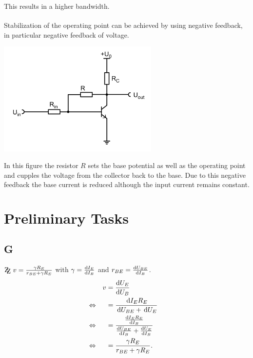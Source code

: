 \documentclass[a4paper,10pt]{article}
\newcommand{\td}{\,\text{d}}
\newcommand{\zz}{\mathrm{Z\kern-.3em\raise-0.5ex\hbox{Z} }}
\newenvironment{Figure}
  {\par\medskip\noindent\minipage{\linewidth}}
  {\endminipage\par\medskip} %
\numberwithin{equation}{section}
\begin{document}
\begin{multicols}{2}
        This results in a higher bandwidth.
        \\\\ Stabilization of the operating point can be achieved by using negative feedback, in particular negative feedback of voltage.
        \begin{Figure}
                \centering
                \includegraphics[width=0.6\textwidth]{spannungsgegenkopplung.png}
        \end{Figure}
        In this figure the resistor $R$ sets the base potential as well as the operating point and cupples the voltage from the collector back to the base.
        Due to this negative feedback the base current is reduced although the input current remains constant.

	\newpage
	\section{Preliminary Tasks}
	\subsection{G}
	$\zz\ v=\tfrac{\gamma R_E}{r_{BE}+\gamma R_E}$ with $\gamma =\diff[]{I_E}{I_B}$ and $r_{BE}=\diff[]{U_{BE}}{I_B}$.
	\begin{align}
		                &  & v & = \diff[]{U_E}{U_B}                                                    &  &           \\
		\Leftrightarrow &  &   & = \dfrac{\td I_ER_E}{\td U_{BE}+\td U_E}                               &  & \nonumber \\
		\Leftrightarrow &  &   & = \dfrac{\diff[]{I_ER_E}{I_B}}{\diff[]{U_{BE}}{I_B}+\diff[]{U_E}{I_B}} &  & \nonumber \\
		\Leftrightarrow &  &   & = \dfrac{\gamma R_E}{r_{BE}+\gamma R_E}.                               &  &
	\end{align}


\end{multicols}
\end{document}
